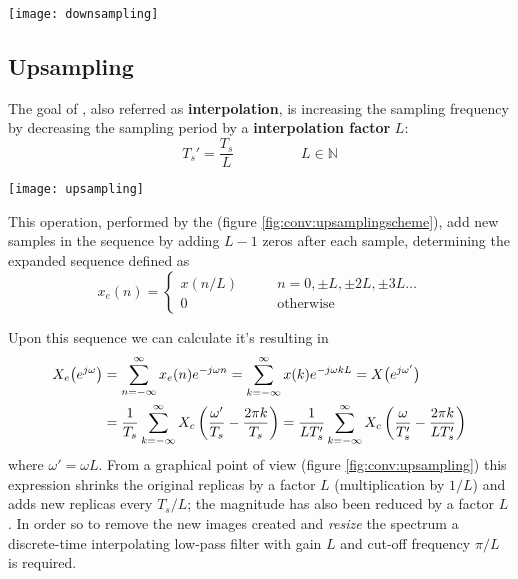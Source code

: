  		\begin{SCfigure}[2][bht]
 			\centering \texttt{[image: downsampling]}
 			\caption{original spectra $X_c(e^{j\omega})$ and it modification after a decimation with $M=2$.} \label{fig:conv:undersamplingresults}
 		\end{SCfigure}	
	
	\subsection{Upsampling}
		
		The goal of , also referred as \textbf{interpolation}, is increasing the sampling frequency by decreasing the sampling period by a \textbf{interpolation factor} $L$:
		\[ T_s' = \frac{T_s}{L} \hspace{2cm} L \in \mathds N \]
		
		\begin{SCfigure}[2][bt]
			\centering \texttt{[image: upsampling]}
			\caption{interpolation scheme with an expander and a interpolator block.}
			\label{fig:conv:upsamplingscheme}
		\end{SCfigure}
	
		This operation, performed by the  (figure \ref{fig:conv:upsamplingscheme}), add new samples in the sequence by adding $L-1$ zeros after each sample, determining the expanded sequence defined as
		\begin{equation}
		x_e(n) = \begin{cases}
			x(n/L) \qquad & n = 0,\pm L, \pm 2 L,\pm 3L \dots \\
			0 & \textrm{otherwise}
		\end{cases}
		\end{equation}		
		
		Upon this sequence we can calculate it's \dtft resulting in 
		\begin{equation}
		\begin{aligned}
			X_e\big(e^{j\omega}\big) & = \sum_{n=-\infty}^\infty x_e(n) e^{-j\omega n} = \sum_{k=-\infty}^\infty x(k) e^{-j\omega kL} = X\big(e^{j\omega'}\big) \\
			& = \frac 1{T_s} \sum_{k=-\infty}^\infty X_c\left( \frac{\omega'}{T_s} - \frac{2\pi k}{T_s} \right) = \frac 1{LT_s'} \sum_{k=-\infty}^\infty X_c\left( \frac{\omega}{T_s'} - \frac{2\pi k}{LT_s'} \right)
		\end{aligned}
		\end{equation}
		where $\omega' = \omega L$. From a graphical point of view (figure \ref{fig:conv:upsampling}) this expression shrinks the original replicas by a factor $L$ (multiplication by $1/L$) and adds new replicas every $T_s/L$; the magnitude has also been reduced by a factor $L$. In order so to remove the new images created and \textit{resize} the spectrum a discrete-time interpolating low-pass filter with gain $L$ and cut-off frequency $\pi/L$ is required.
		
